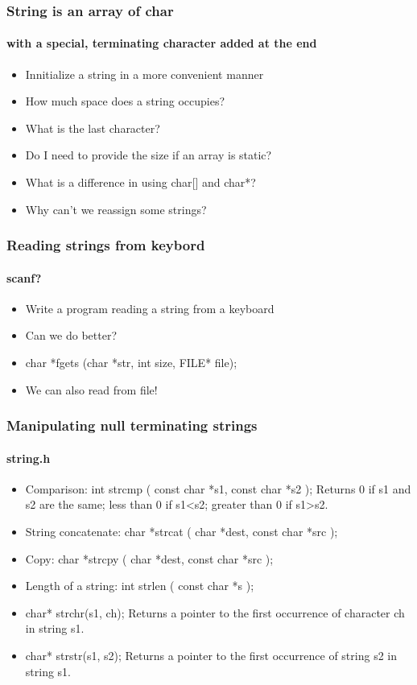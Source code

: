 \documentclass[10pt]{beamer}
\begin{document}
\begin{frame}[fragile]
  \frametitle{String is an array of char}
  \framesubtitle{with a special, terminating character added at the end}  
\centering
  \begin{itemize}
    \item Innitialize a string in a more convenient manner
    \item How much space does a string occupies?
    \item What is the last character?
    \item Do I need to provide the size if an array is static?
    \item What is a difference in using char[] and char*?
    \item Why can't we reassign some strings?
  \end{itemize}

\end{frame}

\begin{frame}[fragile]
  \frametitle{Reading strings from keybord}
  \framesubtitle{scanf?}  
\centering
  \begin{itemize}
    \item Write a program reading a string from a keyboard
    \item Can we do better?
    \item char *fgets (char *str, int size, FILE* file);
    \item We can also read from file!
  \end{itemize}

\end{frame}

\begin{frame}[fragile]
  \frametitle{Manipulating null terminating strings}
  \framesubtitle{string.h}  
\centering
  \begin{itemize}
    \item Comparison: int strcmp ( const char *s1, const char *s2 );
    Returns 0 if s1 and s2 are the same; less than 0 if s1<s2; greater than 0 if s1>s2.
    \item String concatenate: char *strcat ( char *dest, const char *src );
    \item Copy: char *strcpy ( char *dest, const char *src );
    \item Length of a string: int strlen ( const char *s );
     \item char* strchr(s1, ch);
     Returns a pointer to the first occurrence of character ch in string s1.
   	\item char* strstr(s1, s2); Returns a pointer to the first occurrence of string s2 in string s1.
  \end{itemize}

\end{frame}
\end{document}
